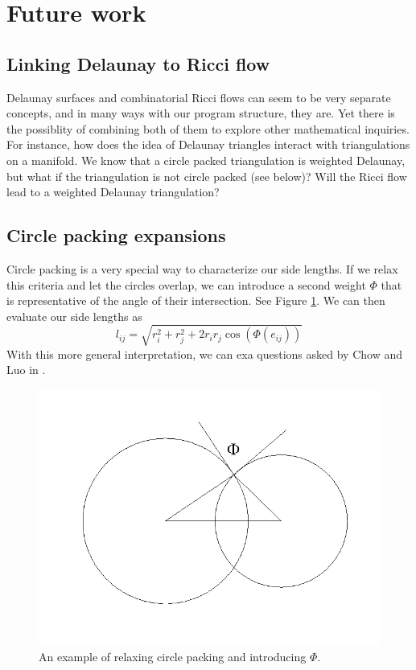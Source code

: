 \documentclass[12pt]{article}
\begin{document}
\section{Future work}
\label{Future}

\subsection{Linking Delaunay to Ricci flow}
Delaunay surfaces and combinatorial Ricci flows can seem to be very separate concepts, and in many ways with our program structure, they are. Yet there is the possiblity of combining both of them to explore other mathematical inquiries. For instance, how does the idea of Delaunay triangles interact with triangulations on a manifold. We know that a circle packed triangulation is weighted Delaunay, but what if the triangulation is not circle packed (see below)? Will the Ricci flow lead to a weighted Delaunay triangulation?

\subsection{Circle packing expansions}
\label{circExt}
Circle packing is a very special way to characterize our side lengths. If we relax this criteria and let the circles overlap, we can introduce a second weight $\Phi$ that is representative of the angle of their intersection. See Figure \ref{fig:intcirc}. We can then evaluate our side lengths as $$l_{ij} = \sqrt{r_i^2 + r_j^2 + 2r_ir_j\cos(\Phi(e_{ij}))}$$ With this more general interpretation, we can exa
 questions asked by Chow and Luo in \cite{chowluo}.

\begin{figure}
\begin{center}
\includegraphics[scale = 0.6]{Pictures/intcirc2.png}
\end{center}
\caption{An example of relaxing circle packing and introducing $\Phi.$}
\label{fig:intcirc}
\end{figure}
\end{document}
